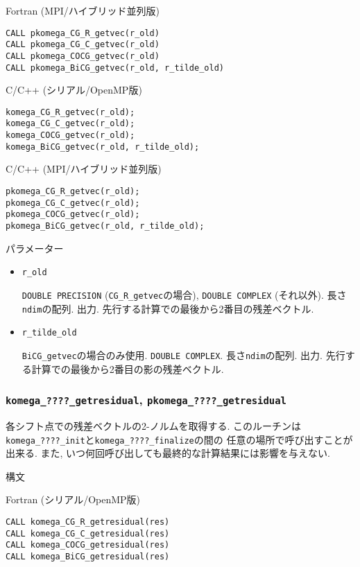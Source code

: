 \documentclass[12pt,titlepage]{jarticle}
\begin{document}
\noindent Fortran (MPI/ハイブリッド並列版)
\begin{verbatim}
CALL pkomega_CG_R_getvec(r_old)
CALL pkomega_CG_C_getvec(r_old)
CALL pkomega_COCG_getvec(r_old)
CALL pkomega_BiCG_getvec(r_old, r_tilde_old)
\end{verbatim}

\noindent C/C++ (シリアル/OpenMP版)
\begin{verbatim}
komega_CG_R_getvec(r_old);
komega_CG_C_getvec(r_old);
komega_COCG_getvec(r_old);
komega_BiCG_getvec(r_old, r_tilde_old);
\end{verbatim}

\noindent C/C++ (MPI/ハイブリッド並列版)
\begin{verbatim}
pkomega_CG_R_getvec(r_old);
pkomega_CG_C_getvec(r_old);
pkomega_COCG_getvec(r_old);
pkomega_BiCG_getvec(r_old, r_tilde_old);
\end{verbatim}

\noindent パラメーター

\begin{itemize}
  
\item \verb|r_old|

  \verb|DOUBLE PRECISION| (\verb|CG_R_getvec|の場合),
  \verb|DOUBLE COMPLEX| (それ以外).
  長さ\verb|ndim|の配列. 出力.
  先行する計算での最後から2番目の残差ベクトル.

\item \verb|r_tilde_old|

  \verb|BiCG_getvec|の場合のみ使用.
  \verb|DOUBLE COMPLEX|.
  長さ\verb|ndim|の配列. 出力.
  先行する計算での最後から2番目の影の残差ベクトル.

\end{itemize}

\subsubsection{\texttt{komega\_????\_getresidual}, \texttt{pkomega\_????\_getresidual}}

各シフト点での残差ベクトルの2-ノルムを取得する.
このルーチンは\verb|komega_????_init|と\verb|komega_????_finalize|の間の
任意の場所で呼び出すことが出来る.
また, いつ何回呼び出しても最終的な計算結果には影響を与えない.

\noindent 構文

\noindent Fortran (シリアル/OpenMP版)
\begin{verbatim}
CALL komega_CG_R_getresidual(res)
CALL komega_CG_C_getresidual(res)
CALL komega_COCG_getresidual(res)
CALL komega_BiCG_getresidual(res)
\end{verbatim}
\end{document}
